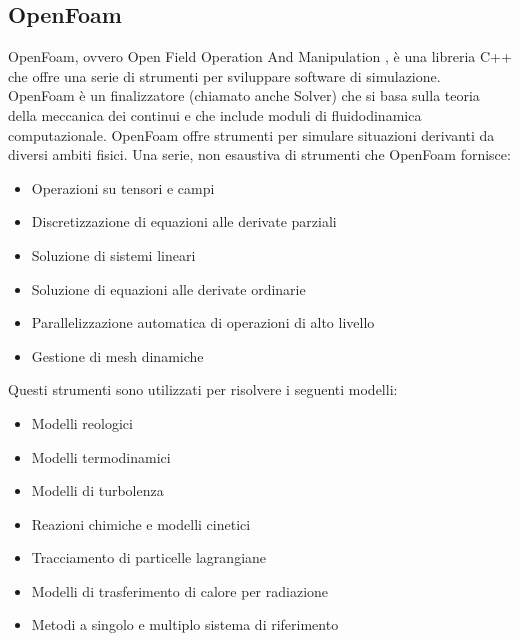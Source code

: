     \subsection{OpenFoam}
    OpenFoam, ovvero Open Field Operation And Manipulation \cite{doi:10.1063/1.168744}, è una libreria C++
    che offre una serie di strumenti per sviluppare software di simulazione.
    OpenFoam è un finalizzatore (chiamato anche Solver) che si basa sulla teoria
    della meccanica dei continui e che include moduli di fluidodinamica computazionale.
    OpenFoam offre strumenti per simulare situazioni derivanti da diversi ambiti fisici.
    Una serie, non esaustiva di strumenti che OpenFoam fornisce:
    \begin{itemize}
        \item Operazioni su tensori e campi
        \item Discretizzazione di equazioni alle derivate parziali
        \item Soluzione di sistemi lineari
        \item Soluzione di equazioni alle derivate ordinarie
        \item Parallelizzazione automatica di operazioni di alto livello
        \item Gestione di mesh dinamiche
    \end{itemize}

    Questi strumenti sono utilizzati per risolvere i seguenti modelli:
    \begin{itemize}
        \item     Modelli reologici
        \item     Modelli termodinamici
        \item     Modelli di turbolenza
        \item     Reazioni chimiche e modelli cinetici
        \item     Tracciamento di particelle lagrangiane
        \item     Modelli di trasferimento di calore per radiazione
        \item     Metodi a singolo e multiplo sistema di riferimento
    \end{itemize}

